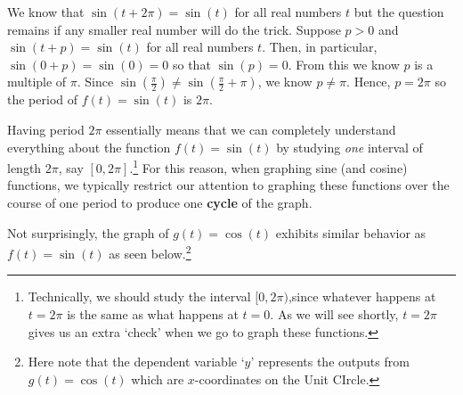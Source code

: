 \documentclass{ximera}
\begin{document}
\smallskip

We know that $\sin(t + 2\pi) = \sin(t)$ for all real numbers $t$ but the question remains if any smaller real number will do the trick.  Suppose $p>0$ and $\sin(t + p) = \sin(t)$ for all real numbers $t$.  Then, in particular, $\sin(0+p) = \sin(0)=0$ so that $\sin(p) = 0$.  From this we know $p$ is a multiple of $\pi$.  Since $\sin\left(\frac{\pi}{2} \right)  \neq \sin\left(\frac{\pi}{2} + \pi \right) $, we know $p \neq \pi$.  Hence, $p  = 2\pi$ so the period of $f(t) = \sin(t)$ is $2\pi$. 

\smallskip

Having period $2\pi$ essentially means that we can completely understand everything about the function  $f(t) =  \sin(t)$ by studying \textit{one} interval of length $2\pi$, say $[0,2\pi]$.\footnote{Technically, we should study the interval $[0,2\pi)$,\footnotemark since whatever happens at $t=2\pi$ is the same as what happens at $t=0$.  As we will see shortly, $t=2\pi$ gives us an extra `check' when we go to graph these functions.} \footnotetext{In some advanced texts, the interval of choice is $[-\pi, \pi)$.}  For this reason, when graphing sine (and cosine) functions, we typically restrict our attention to graphing these functions over the course of one period to produce one \textbf{cycle} of the graph. 
 
\smallskip


Not surprisingly, the graph of $g(t) = \cos(t)$ exhibits similar behavior as $f(t) = \sin(t)$ as seen below.\footnote{Here note that the dependent variable `$y$' represents the outputs from  $g(t) = \cos(t)$ which are $x$-coordinates on the Unit CIrcle.}  
\end{document}
